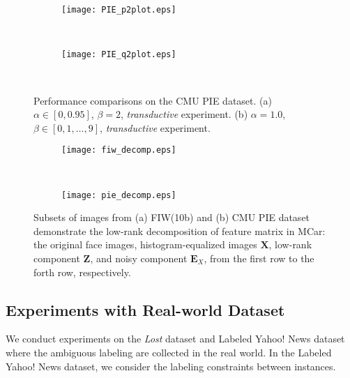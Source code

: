 \documentclass[10pt,journal,compsoc]{IEEEtran}
\begin{document}
\begin{figure*}
        \centering
        \begin{subfigure}[b]{0.4\textwidth}
                \texttt{[image: PIE\_p2plot.eps]}
                \caption{}\label{fig:pie_a}
        \end{subfigure}\,
        \begin{subfigure}[b]{0.4\textwidth}
                \texttt{[image: PIE\_q2plot.eps]}
                \caption{}\label{fig:pie_b}
        \end{subfigure}\,
        \caption{Performance comparisons on the CMU PIE dataset. (a) $\alpha \in [0, 0.95]$, $\beta=2$, \emph{transductive} experiment. (b) $\alpha= 1.0$, $\beta  \in [0,1, \dots, 9]$, \emph{transductive} experiment.}\label{fig:pie_set}
\end{figure*}





\begin{figure}
        \centering
        \begin{subfigure}{\columnwidth}
        \centering
                \texttt{[image: fiw\_decomp.eps]}
                \caption{}\label{fig:X_decomp_fiw}
        \end{subfigure}\\
        \begin{subfigure}{\columnwidth}
        \centering
                \texttt{[image: pie\_decomp.eps]}
                \caption{}\label{fig:X_decomp_pie}
        \end{subfigure}
        \caption{Subsets of images from (a) FIW(10b) and (b) CMU PIE dataset demonstrate the low-rank decomposition of feature matrix in MCar: the original face images, histogram-equalized images $\mathbf{X}$, low-rank component $\mathbf{Z}$, and noisy component $\mathbf{E}_X$, from the first row to the forth row, respectively.}
\end{figure}



\subsection{Experiments with Real-world Dataset}
We conduct experiments on the \emph{Lost} dataset and Labeled Yahoo! News dataset where the ambiguous labeling are collected in the real world. In the Labeled Yahoo! News dataset, we consider the labeling constraints between instances.
\end{document}
